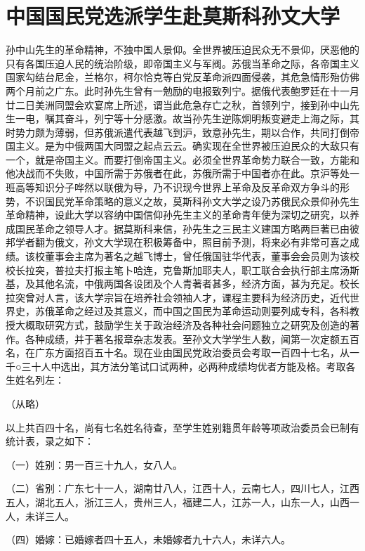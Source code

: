 \section[中国国民党选派学生赴莫斯科孙文大学（一九二五年十二月十三日）]{中国国民党选派学生赴莫斯科孙文大学}


孙中山先生的革命精神，不独中国人景仰。全世界被压迫民众无不景仰，厌恶他的只有各国压迫人民的统治阶级，即帝国主义与军阀。苏俄当革命之际，各帝国主义国家勾结台尼金，兰格尔，柯尔恰克等白党反革命派四面侵袭，其危急情形殆仿佛两个月前之广东。此时孙先生曾有一勉励的电报致列宁。据俄代表鲍罗廷在十一月廿二日美洲同盟会欢宴席上所述，谓当此危急存亡之秋，首领列宁，接到孙中山先生一电，嘱其奋斗，列宁等十分感激。故当孙先生逆陈炯明叛变避走上海之际，其时势力颇为薄弱，但苏俄派遣代表越飞到沪，致意孙先生，期以合作，共同打倒帝国主义。是为中俄两国大同盟之起点云云。确实现在全世界被压迫民众的大敌只有一个，就是帝国主义。而要打倒帝国主义。必须全世界革命势力联合一致，方能和他决战而不失败，中国所需于苏俄者在此，苏俄所需于中国者亦在此。京沪等处一班高等知识分子哗然以联俄为导，乃不识现今世界上革命及反革命双方争斗的形势，不识国民党革命策略的意义之故，莫斯科孙文大学之设乃苏俄民众景仰孙先生革命精神，设此大学以容纳中国信仰孙先生主义的革命青年使为深切之研究，以养成国民革命之领导人才。据莫斯科来信，孙先生之三民主义建国方略两巨著已由彼邦学者翻为俄文，孙文大学现在积极筹备中，照目前予测，将来必有非常可喜之成绩。该校董事会主席为著名之越飞博士，曾任俄国驻华代表，董事会会员则为该校校长拉突，普拉夫打报主笔卜哈连，克鲁斯加耶夫人，职工联合会执行部主席汤斯基，及其他名流，中俄两国各设团及个人青著者甚多，经济方面，甚为充足。校长拉突曾对人言，该大学宗旨在培养社会领袖人才，课程主要科为经济历史，近代世界史，苏俄革命之经过及其意义，而中国之国民为革命运动则要列成专科，各科教授大概取研究方式，鼓励学生关于政治经济及各种社会问题独立之研究及创造的著作。各种成绩，并于著名报章杂志发表。至孙文大学学生人数，闻第一次定额五百名，在广东方面招百五十名。现在业由国民党政治委员会考取一百四十七名，从一千○三十人中选出，其方法分笔试口试两种，必两种成绩均优者方能及格。考取各生姓名列左：

（从略）

以上共百四十名，尚有七名姓名待查，至学生姓别籍贯年龄等项政治委员会已制有统计表，录之如下：

（一）姓别：男一百三十九人，女八人。

（二）省别：广东七十一人，湖南廿八人，江西十人，云南七人，四川七人，江西五人，湖北五人，浙江三人，贵州三人，福建二人，江苏一人，山东一人，山西一人，未详三人。

（四）婚嫁：已婚嫁者四十五人，未婚嫁者九十六人，未详六人。

